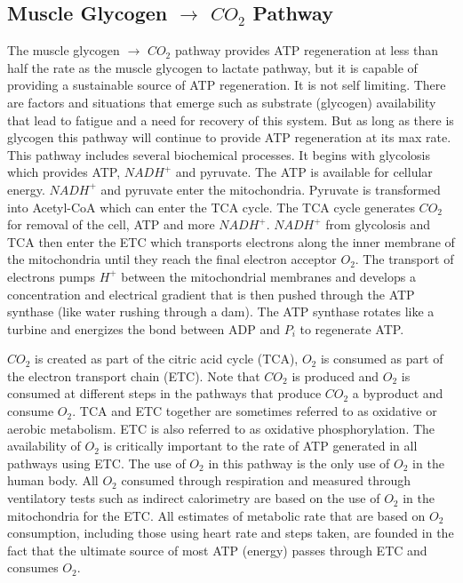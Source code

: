 
\subsection{Muscle Glycogen $\rightarrow$ $CO_2$ Pathway}

The muscle glycogen $\rightarrow$ $CO_2$ pathway provides ATP regeneration at less than half the rate as the muscle glycogen to lactate pathway, but it is capable of providing a sustainable source of ATP regeneration. It is not self limiting. There are factors and situations that emerge such as substrate (glycogen) availability that lead to fatigue and a need for recovery of this system. But as long as there is glycogen this pathway will continue to provide ATP regeneration at its max rate. This pathway includes several biochemical processes. It begins with glycolosis which provides ATP, $NADH^+$ and pyruvate. The ATP is available for cellular energy. $NADH^+$ and pyruvate enter the mitochondria. Pyruvate is transformed into Acetyl-CoA which can enter the TCA cycle. The TCA cycle generates $CO_2$ for removal of the cell, ATP and more $NADH^+$. $NADH^+$ from glycolosis and TCA then enter the ETC which transports electrons along the inner membrane of the mitochondria until they reach the final electron acceptor $O_2$. The transport of electrons pumps $H^+$ between the mitochondrial membranes and develops a concentration and electrical gradient  that is then pushed through the ATP synthase (like water rushing through a dam). The ATP synthase rotates like a turbine and energizes the bond between ADP and $P_i$ to regenerate ATP. 

$CO_2$ is created as part of the citric acid cycle (TCA), $O_2$ is consumed as part of the electron transport chain (ETC). Note that $CO_2$ is produced and $O_2$ is consumed at different steps in the pathways that produce $CO_2$ a byproduct and consume $O_2$. TCA and ETC together are sometimes referred to as oxidative or aerobic metabolism. ETC is also referred to as oxidative phosphorylation. The availability of $O_2$ is critically important to the rate of ATP generated in all pathways using ETC. The use of $O_2$ in this pathway is the only use of $O_2$ in the human body. All $O_2$ consumed through respiration and measured through ventilatory tests such as indirect calorimetry are based on the use of $O_2$ in the mitochondria for the ETC. All estimates of metabolic rate that are based on $O_2$ consumption, including those using heart rate and steps taken, are founded in the fact that the ultimate source of most ATP (energy) passes through ETC and consumes $O_2$.


